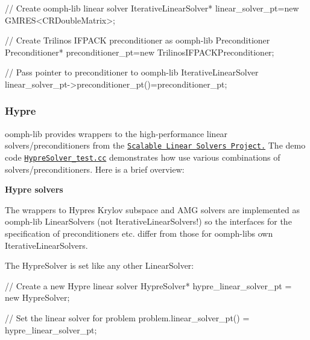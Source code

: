  
\begin{DoxyCodeInclude}
   \textcolor{comment}{// Create oomph-lib linear solver}
   IterativeLinearSolver* linear\_solver\_pt=\textcolor{keyword}{new} GMRES<CRDoubleMatrix>;

   \textcolor{comment}{// Create Trilinos IFPACK preconditioner as oomph-lib Preconditioner}
   Preconditioner* preconditioner\_pt=\textcolor{keyword}{new} TrilinosIFPACKPreconditioner;

   \textcolor{comment}{// Pass pointer to preconditioner to oomph-lib IterativeLinearSolver}
   linear\_solver\_pt->preconditioner\_pt()=preconditioner\_pt;

\end{DoxyCodeInclude}




 

\hypertarget{index_hypre}{}\subsubsection{Hypre}\label{index_hypre}
{\ttfamily oomph-\/lib} provides wrappers to the high-\/performance linear solvers/preconditioners from the \href{https://computation.llnl.gov/casc/linear_solvers/sls_hypre.html}{\tt Scalable Linear Solvers Project.} The demo code \href{../../../demo_drivers/linear_solvers/HypreSolver_test.cc}{\tt Hypre\+Solver\+\_\+test.\+cc} demonstrates how use various combinations of solvers/preconditioners. Here is a brief overview\+:

{\bfseries Hypre solvers}

The wrappers to Hypre\textquotesingle{}s Krylov subspace and A\+MG solvers are implemented as {\ttfamily oomph-\/lib} {\ttfamily Linear\+Solvers} (not {\ttfamily Iterative\+Linear\+Solvers!}) so the interfaces for the specification of preconditioners etc. differ from those for {\ttfamily oomph-\/lib\textquotesingle{}s} own {\ttfamily Iterative\+Linear\+Solvers}.

The {\ttfamily Hypre\+Solver} is set like any other {\ttfamily Linear\+Solver\+:} 

 
\begin{DoxyCodeInclude}
 \textcolor{comment}{// Create a new Hypre linear solver}
 HypreSolver* hypre\_linear\_solver\_pt = \textcolor{keyword}{new} HypreSolver;

 \textcolor{comment}{// Set the linear solver for problem}
 problem.linear\_solver\_pt() = hypre\_linear\_solver\_pt;

\end{DoxyCodeInclude}


